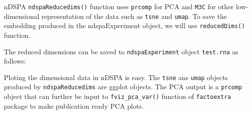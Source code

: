 \documentclass[]{article}
\newcommand{\hlnum}[1]{\textcolor[rgb]{0.816,0.125,0.439}{#1}}%
\newcommand{\hlstr}[1]{\textcolor[rgb]{0.251,0.627,0.251}{#1}}%
\newcommand{\hlcom}[1]{\textcolor[rgb]{0.502,0.502,0.502}{\textit{#1}}}%
\newcommand{\hlstd}[1]{\textcolor[rgb]{0.251,0.251,0.251}{#1}}%
\newenvironment{Shaded}{\begin{myshaded}}{\end{myshaded}}
\newcommand{\DecValTok}[1]{\hlnum{#1}}
\newcommand{\SpecialCharTok}[1]{\hlstr{#1}}
\newcommand{\StringTok}[1]{\hlstr{#1}}
\newcommand{\DocumentationTok}[1]{\hlcom{#1}}
\newcommand{\OtherTok}[1]{{#1}}
\newcommand{\FunctionTok}[1]{\hlstd{#1}}
\newcommand{\AttributeTok}[1]{{#1}}
\newcommand{\NormalTok}[1]{\hlstd{#1}}
\begin{document}
nDSPA \texttt{ndspaReducedims()} function uses \texttt{prcomp} for PCA and \texttt{M3C} for other
low-dimensional representation of the data such as \texttt{tsne} and \texttt{umap}. To save
the embedding produced in the ndspaExperiment object, we will use
\texttt{reducedDims()} function.

\begin{Shaded}
\end{Shaded}

The reduced dimensions can be saved to \texttt{ndspaExperiment} object \texttt{test.rna} as
follows:

\begin{Shaded}
\end{Shaded}

Ploting the dimensional data in nDSPA is easy. The \texttt{tsne} ans \texttt{umap} objects
produced by \texttt{ndspaReducedims} are ggplot objects. The PCA output is a \texttt{prcomp}
object that can further be input to \texttt{fviz\_pca\_var()} function of \texttt{factoextra}
package to make publication ready PCA plots.
\end{document}
